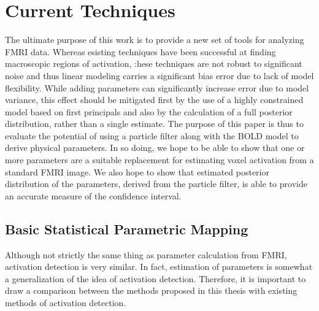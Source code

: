 
\chapter{Current Techniques}
The ultimate purpose of this work is to provide a new set of tools
for analyzing FMRI data. Whereas esisting techniques have been 
successful at finding macroscopic regions of activation, :hese
techniques are not robust to significant noise and thus linear 
modeling carries a significant bias error due to lack of model
flexibility. While adding parameters can significantly increase
error due to model variance, this effect should be mitigated first
by the use of a highly constrained model based on first principals
and also by the
calculation of a full posterior distribution, rather than a single
estimate. The
purpose of this paper is thus to evaluate the potential of using
a particle filter along with the BOLD model to derive physical 
parameters. In so doing, we hope to be able to show that one or more
parameters are a suitable replacement for estimating voxel 
activation from a standard FMRI image. We also hope to show that 
estimated posterior distribution of the parameters, derived from
the particle filter, is able to provide an accurate measure of the
confidence interval.

\section{Basic Statistical Parametric Mapping}
Although not strictly the same thing as parameter calculation from 
FMRI, activation detection is very similar. In fact, estimation of 
parameters is somewhat a generalization of the idea of activation detection.
Therefore, it is important to draw a comparison between the methods proposed
in this thesis with existing methods of activation detection.

